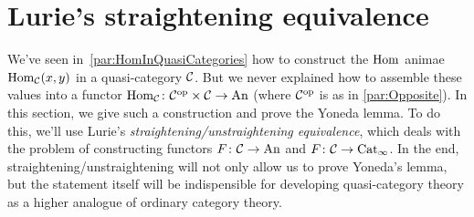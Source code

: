 \newpage
\section{Lurie's straightening equivalence}\label{sec:Straightening}
We've seen in~\cref{par:HomInQuasiCategories} how to construct the $\operatorname{Hom}$ animae $\operatorname{Hom}_{\mathcal{C}}(x,y)$ in a quasi-category $\mathcal{C}$. But we never explained how to assemble these values into a functor $\operatorname{Hom}_{\mathcal{C}}\colon \mathcal{C}^{\mathrm{op}}\times\mathcal{C}\rightarrow\mathrm{An}$ (where $\mathcal{C}^{\mathrm{op}}$ is as in \cref{par:Opposite}). In this section, we give such a construction and prove the Yoneda lemma. To do this, we'll use Lurie's \emph{straightening/unstraightening equivalence}, which deals with the problem of constructing functors $F\colon \mathcal{C}\rightarrow\mathrm{An}$ and $F\colon \mathcal{C}\rightarrow\mathrm{Cat}_\infty$. In the end, straightening/unstraightening will not only allow us to prove Yoneda's lemma, but the statement itself will be indispensible for developing quasi-category theory as a higher analogue of ordinary category theory.

